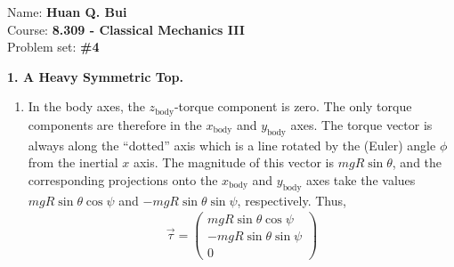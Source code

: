 \documentclass{article}
\theoremstyle{definition}
\begin{document}
\begin{framed}
	\noindent Name: \textbf{Huan Q. Bui}\\
	Course: \textbf{8.309 - Classical Mechanics III}\\
	Problem set: \textbf{\#4}
\end{framed}
	
	

\noindent \textbf{1. A Heavy Symmetric Top.}
\begin{enumerate}[label=(\alph*)]
	\item In the body axes, the $z_\text{body}$-torque component is zero. The only torque components are therefore in the $x_\text{body}$ and $y_\text{body}$ axes. The torque vector is always along the ``dotted'' axis which is a line rotated by the (Euler) angle $\phi$ from the inertial $x$ axis. The magnitude of this vector is $mgR\sin\theta$, and the corresponding projections onto the $x_\text{body}$ and $y_\text{body}$ axes take the values $mgR\sin\theta\cos\psi$ and $-mgR \sin\theta\sin\psi$, respectively. Thus,
	\begin{align*}
	\vec{\tau} = 
	\begin{pmatrix}
	mgR\sin\theta \cos\psi\\
	-mgR\sin\theta \sin\psi\\
	0
	\end{pmatrix}
	\end{align*}
 	

\end{enumerate}
\end{document}
